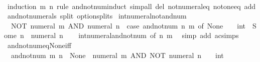 \begin{isabellebody}
%
\isadelimproof
\ \ %
\endisadelimproof
%
\isatagproof
{}\isamarkupfalse%
\ {\isacharparenleft}{\kern0pt}induction\ m\ n\ rule{\isacharcolon}{\kern0pt}\ and{\isacharunderscore}{\kern0pt}not{\isacharunderscore}{\kern0pt}num{\isachardot}{\kern0pt}induct{\isacharparenright}{\kern0pt}\ {\isacharparenleft}{\kern0pt}simp{\isacharunderscore}{\kern0pt}all\ del{\isacharcolon}{\kern0pt}\ not{\isacharunderscore}{\kern0pt}numeral{\isacharunderscore}{\kern0pt}eq\ not{\isacharunderscore}{\kern0pt}one{\isacharunderscore}{\kern0pt}eq\ add{\isacharcolon}{\kern0pt}\ and{\isacharunderscore}{\kern0pt}not{\isacharunderscore}{\kern0pt}numerals\ split{\isacharcolon}{\kern0pt}\ option{\isachardot}{\kern0pt}splits{\isacharparenright}{\kern0pt}%
\endisatagproof
{\isafoldproof}%
%
\isadelimproof
\isanewline
%
\endisadelimproof
\isanewline
{}\isamarkupfalse%
\ int{\isacharunderscore}{\kern0pt}numeral{\isacharunderscore}{\kern0pt}not{\isacharunderscore}{\kern0pt}and{\isacharunderscore}{\kern0pt}num{\isacharcolon}{\kern0pt}\isanewline
\ \ {\isacartoucheopen}NOT\ {\isacharparenleft}{\kern0pt}numeral\ m{\isacharparenright}{\kern0pt}\ AND\ numeral\ n\ {\isacharequal}{\kern0pt}\ {\isacharparenleft}{\kern0pt}case\ and{\isacharunderscore}{\kern0pt}not{\isacharunderscore}{\kern0pt}num\ n\ m\ of\ None\ {\isasymRightarrow}\ {}\ {\isacharcolon}{\kern0pt}{\isacharcolon}{\kern0pt}\ int\ {\isacharbar}{\kern0pt}\ Some\ n{\isacharprime}{\kern0pt}\ {\isasymRightarrow}\ numeral\ n{\isacharprime}{\kern0pt}{\isacharparenright}{\kern0pt}{\isacartoucheclose}\isanewline
%
\isadelimproof
\ \ %
\endisadelimproof
%
\isatagproof
{}\isamarkupfalse%
\ int{\isacharunderscore}{\kern0pt}numeral{\isacharunderscore}{\kern0pt}and{\isacharunderscore}{\kern0pt}not{\isacharunderscore}{\kern0pt}num\ {\isacharbrackleft}{\kern0pt}of\ n\ m{\isacharbrackright}{\kern0pt}\ \isamarkupfalse%
\ {\isacharparenleft}{\kern0pt}simp\ add{\isacharcolon}{\kern0pt}\ ac{\isacharunderscore}{\kern0pt}simps{\isacharparenright}{\kern0pt}%
\endisatagproof
{\isafoldproof}%
%
\isadelimproof
\isanewline
%
\endisadelimproof
\isanewline
{}\isamarkupfalse%
\ and{\isacharunderscore}{\kern0pt}not{\isacharunderscore}{\kern0pt}num{\isacharunderscore}{\kern0pt}eq{\isacharunderscore}{\kern0pt}None{\isacharunderscore}{\kern0pt}iff{\isacharcolon}{\kern0pt}\isanewline
\ \ {\isacartoucheopen}and{\isacharunderscore}{\kern0pt}not{\isacharunderscore}{\kern0pt}num\ m\ n\ {\isacharequal}{\kern0pt}\ None\ {\isasymlongleftrightarrow}\ numeral\ m\ AND\ NOT\ {\isacharparenleft}{\kern0pt}numeral\ n{\isacharparenright}{\kern0pt}\ {\isacharequal}{\kern0pt}\ {\isacharparenleft}{\kern0pt}{}\ {\isacharcolon}{\kern0pt}{\isacharcolon}{\kern0pt}\ int{\isacharparenright}{\kern0pt}{\isacartoucheclose}\isanewline

\end{isabellebody}
